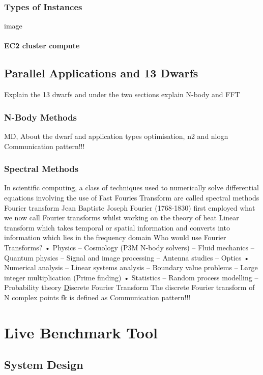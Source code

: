 \documentclass[12pt,a4paper]{report}
\begin{document}
\subsection{Types of Instances}
  
image{}

\subsubsection{EC2 cluster compute} 


\section{Parallel Applications and 13 Dwarfs}  
Explain the 13 dwarfs and under the two sections explain N-body and FFT  
\subsection{N-Body Methods}  
MD, About the dwarf and application types optimisation, n2 and nlogn  
Communication pattern!!!  
\subsection{Spectral Methods}  
In scientific computing, a class of techniques used to numerically solve differential equations involving the use of Fast Fouries Transform are called spectral methods  
Fourier transform  
Jean Baptiste Joseph Fourier (1768-1830) first employed what we now call Fourier transforms whilst working on the theory of heat   
Linear transform which takes temporal or spatial information and converts into information which lies in the frequency domain  
Who would use Fourier Transforms?   
• Physics   
– Cosmology (P3M N-body solvers)   
– Fluid mechanics   
– Quantum physics   
– Signal and image processing   
– Antenna studies   
– Optics   
• Numerical analysis   
– Linear systems analysis   
– Boundary value problems   
– Large integer multiplication (Prime finding)   
• Statistics   
– Random process modelling   
– Probability theory  
{\underline Discrete Fourier Transform}  
The discrete Fourier transform of N complex points fk is defined as   
Communication pattern!!!  
 

\chapter{Live Benchmark Tool}
\section{System Design}
\end{document}
